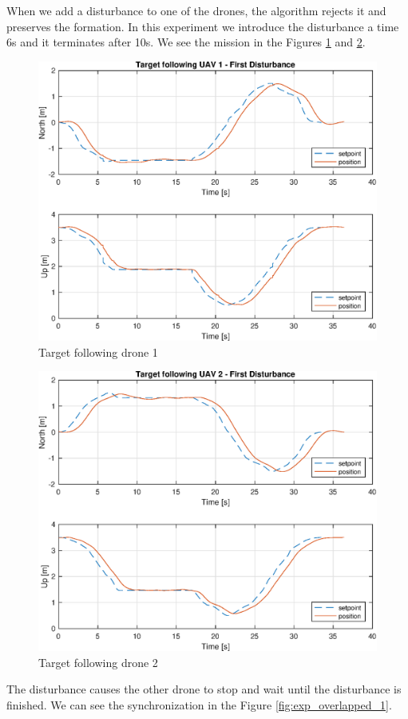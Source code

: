 When we add a disturbance to one of the drones, the algorithm rejects it and preserves
the formation. In this experiment we introduce the disturbance a time 6s and it
terminates after 10s. We see the mission in the Figures \ref{fig:exp_following_1_1}
and \ref{fig:exp_following_2_1}.

\begin{figure}
\centering
\includegraphics[width=0.7\linewidth]{chapters/chapter-05/figures/following_1_1.eps}
\caption{Target following drone 1}
\label{fig:exp_following_1_1}
\end{figure}

\begin{figure}
\centering
\includegraphics[width=0.7\linewidth]{chapters/chapter-05/figures/following_2_1.eps}
\caption{Target following drone 2}
\label{fig:exp_following_2_1}
\end{figure}

The disturbance causes the other drone to stop and wait until the disturbance
is finished. We can see the synchronization in the Figure \ref{fig:exp_overlapped_1}.

